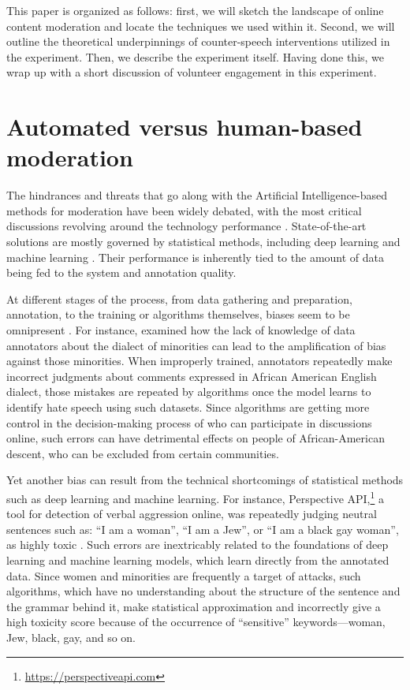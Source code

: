 \documentclass[preprint,12pt]{elsarticle}
\begin{document}
This paper is organized as follows: first, we will sketch the landscape of online content moderation and locate the techniques we used  within it. Second, we will outline the theoretical underpinnings of counter-speech interventions utilized in the experiment. Then, we describe the experiment itself. Having done this, we wrap up  with a  short discussion of  volunteer engagement in this experiment.






\section{Automated versus human-based moderation}\label{sec:automated-versus-human}

The hindrances and threats that go along with the Artificial Intelligence-based methods for moderation have been widely debated, with the most critical discussions revolving around the technology performance \citep{macavaney2019hate, schmidt2017survey}. 
State-of-the-art solutions are mostly governed by statistical methods, including deep learning and machine learning \citep{jordan2015machine, lecun2015deep, sejnowski2020unreasonable}. Their performance is inherently tied to the amount of data being fed to the system and annotation quality.

At different stages of the process, from data gathering and preparation, annotation,  to the training or algorithms themselves, biases seem to be omnipresent \citep{binns2017like, geva2019we, mehrabi2021survey}. For instance, \citet{sap_risk_2019} examined how the lack of knowledge of data annotators about the dialect of minorities can lead to the amplification of bias against those minorities. When improperly trained, annotators repeatedly make incorrect judgments about comments expressed in African American English dialect, those mistakes are repeated by algorithms once the model learns to identify hate speech using such datasets. Since algorithms are getting more control in the decision-making process of who can participate in discussions online, such errors can have detrimental effects on people of African-American descent, who can be excluded from certain communities.

Yet another bias can result from the technical shortcomings of statistical methods such as deep learning and machine learning. For instance, Perspective API,\footnote{\url{https://perspectiveapi.com}} a tool for detection of verbal aggression online, was repeatedly judging neutral sentences such as: “I am a woman”, “I am a Jew”, or “I am a black gay woman”, as highly toxic \citep{jigsaw2019}. Such errors are inextricably related to the foundations of deep learning and machine learning models, which learn directly from the annotated data. Since women and minorities are frequently a target of attacks, such algorithms, which have no understanding about the structure of the sentence and the grammar behind it, make statistical approximation and incorrectly give a high toxicity score because of the occurrence of “sensitive” keywords—woman, Jew, black, gay, and so on.
\end{document}
